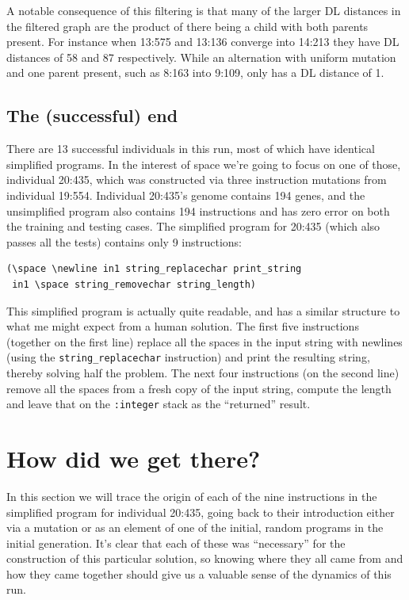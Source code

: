 A notable consequence of this filtering is that many of the larger DL distances in
the filtered graph are the product of there being a child with both parents present.
For instance when 13:575 and 13:136 converge into 14:213 they have DL distances of
58 and 87 respectively. While an alternation with uniform mutation and one parent present,
such as 8:163 into 9:109,  only has a DL distance of 1.

\subsection{The (successful) end}
\label{sec:successfulEnd}


There are 13 successful individuals
in this run, most of which have identical simplified
programs. In the interest of space we're going to focus on one of those, 
individual 20:435, which was constructed via three instruction mutations
from individual 19:554.
Individual 20:435's genome contains 194 genes, and the unsimplified 
program also contains 194 instructions and has zero error on both
the training and testing cases.
The simplified program for 20:435 (which also passes all the tests)
contains only 9 instructions:
\begin{verbatim}
(\space \newline in1 string_replacechar print_string
 in1 \space string_removechar string_length)
\end{verbatim}
This simplified program is actually quite readable, and has a similar
structure to what me might expect from a human solution.
The first five 
instructions (together on the first line) replace all the spaces in the input string 
with newlines (using the \texttt{string\_replacechar} instruction) and print the 
resulting string, thereby solving half the problem. 
The next four instructions (on the second line) remove all the spaces from
a fresh copy of the input string, compute the length and leave that on the
\texttt{:integer} stack as the ``returned'' result.

\section{How did we get there?}
\label{sec:howDidWeGetThere}

In this section we will trace the origin of each of the nine instructions
in the simplified program for individual 20:435,
going back to their introduction either via a mutation or as an element 
of one of the initial, random programs in the initial generation. It's clear
that each of these was ``necessary'' for the construction of this particular
solution, so knowing where they all came from and how they came together
should give us a valuable sense of the dynamics of this run. 

